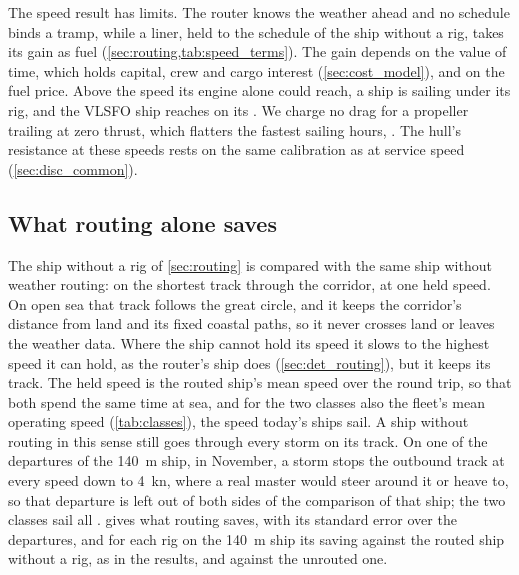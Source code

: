 The speed result has limits. The router knows the weather ahead and no schedule binds a tramp, while a liner, held to the schedule of the ship without a rig, takes its gain as fuel (\cref{sec:routing,tab:speed_terms}). The gain depends on the value of time, which holds capital, crew and cargo interest (\cref{sec:cost_model}), and on the fuel price. Above the speed its engine alone could reach, a ship is sailing under its rig, and the  VLSFO ship reaches  on its . We charge no drag for a propeller trailing at zero thrust, which flatters the fastest sailing hours, . The hull's resistance at these speeds rests on the same calibration as at service speed (\cref{sec:disc_common}).

\subsection{What routing alone saves}
\label{app:routing_value}

The ship without a rig of \cref{sec:routing} is compared with the same ship without weather routing: on the shortest track through the corridor, at one held speed. On open sea that track follows the great circle, and it keeps the corridor's distance from land and its fixed coastal paths, so it never crosses land or leaves the weather data. Where the ship cannot hold its speed it slows to the highest speed it can hold, as the router's ship does (\cref{sec:det_routing}), but it keeps its track. The held speed is the routed ship's mean speed over the round trip, so that both spend the same time at sea, and for the two classes also the fleet's mean operating speed (\cref{tab:classes}), the speed today's ships sail. A ship without routing in this sense still goes through every storm on its track. On one of the \NumRoutingSampled{} departures of the \SI{140}{m} ship, in November, a storm stops the outbound track at every speed down to \SI{4}{kn}, where a real master would steer around it or heave to, so that departure is left out of both sides of the comparison of that ship; the two classes sail all \NumRoutingSampled.  gives what routing saves, with its standard error over the departures, and for each rig on the \SI{140}{m} ship its saving against the routed ship without a rig, as in the results, and against the unrouted one.


